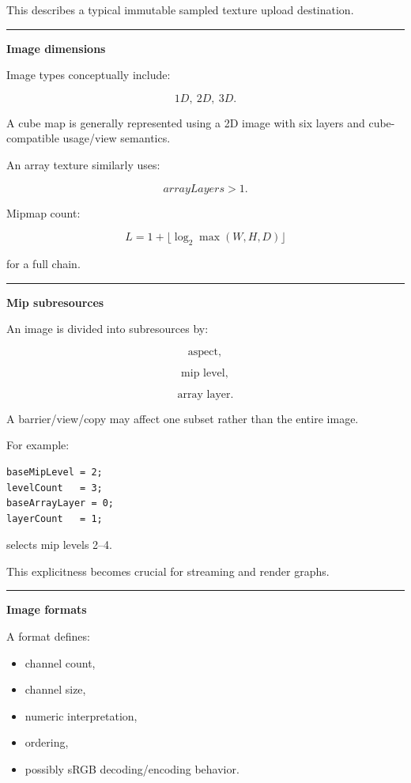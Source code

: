 This describes a typical immutable sampled texture upload destination.

\begin{center}\rule{0.5\linewidth}{0.5pt}\end{center}

\textbf{Image dimensions}

Image types conceptually include:

\[
1D,\ 2D,\ 3D.
\]

A cube map is generally represented using a 2D image with six layers and cube-compatible usage/view semantics.

An array texture similarly uses:

\[
arrayLayers>1.
\]

Mipmap count:

\[
L=
1+
\lfloor
\log_2
\max(W,H,D)
\rfloor
\]

for a full chain.

\begin{center}\rule{0.5\linewidth}{0.5pt}\end{center}

\textbf{Mip subresources}

An image is divided into subresources by:

\[
\text{aspect},
\]

\[
\text{mip level},
\]

\[
\text{array layer}.
\]

A barrier/view/copy may affect one subset rather than the entire image.

For example:

\begin{verbatim}
baseMipLevel = 2;
levelCount   = 3;
baseArrayLayer = 0;
layerCount   = 1;
\end{verbatim}

selects mip levels 2--4.

This explicitness becomes crucial for streaming and render graphs.

\begin{center}\rule{0.5\linewidth}{0.5pt}\end{center}

\textbf{Image formats}

A format defines:

\begin{itemize}
\tightlist
\item
  channel count,
\item
  channel size,
\item
  numeric interpretation,
\item
  ordering,
\item
  possibly sRGB decoding/encoding behavior.
\end{itemize}


